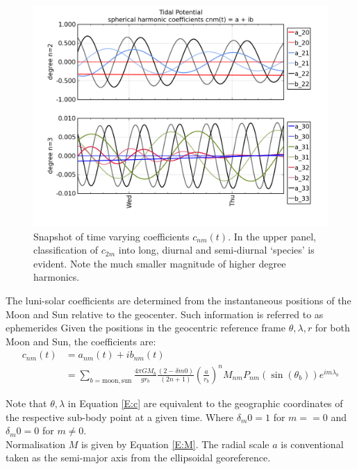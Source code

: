 \begin{figure}[h]
\begin{center}
\includegraphics[width=\figwidthBig]{figures/plots/tidal_coeff_timeseries_2days.png}
\caption{Snapshot of time varying coefficients $c_{nm}(t)$.  In the upper panel, classification of $c_{2m}$ into long, diurnal and semi-diurnal `species' is evident.  Note the much smaller magnitude of higher degree harmonics.}
\end{center}
\end{figure}

The luni-solar coefficients are determined from the instantaneous positions of the Moon and Sun relative to the geocenter.  Such information is referred to as ephemerides \citep[Section 8.1]{Urban:2013vl}
Given the positions in the geocentric reference frame $\theta,\lambda,r$ for both Moon and Sun, the coefficients are:
\begin{align}
\label{E:c}
c_{nm}(t) &= a_{nm}(t) + ib_{nm}(t) \nonumber \\
          &= \sum_{b=\text{moon},\text{sun}}    \frac{4 \pi GM_{b}}{g r_{b}}  \frac{(2-\delta{m0})} {(2n+1)} \left(\frac{a}{r_b} \right)^n    M_{nm} P_{nm}( \sin(\theta_b) ) e^{im\lambda_b}
\end{align}

Note that $\theta,\lambda$ in Equation \ref{E:c} are equivalent to the geographic coordinates of the respective sub-body point at a given time. 
Where $\delta_m0 = 1$ for $m==0$ and $\delta_m0 = 0$ for $m \neq 0$.\\
Normalisation $M$ is given by Equation \ref{E:M}. The radial scale $a$ is conventional taken as the semi-major axis from the ellipsoidal georeference. 



